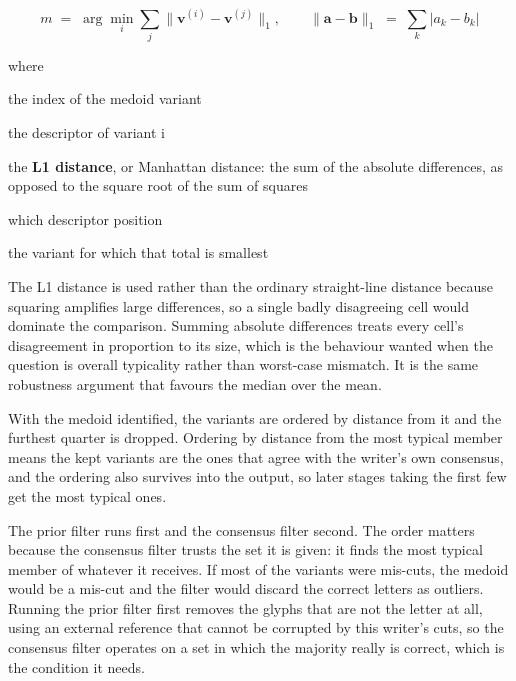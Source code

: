 \begin{equation}
m \;=\; \arg\min_{i} \sum_{j} \big\| \mathbf{v}^{(i)} - \mathbf{v}^{(j)} \big\|_{1}, \qquad \big\|\mathbf{a} - \mathbf{b}\big\|_{1} \;=\; \sum_{k} \big| a_k - b_k \big|
\end{equation}

\noindent where
\begin{description}[leftmargin=2.4em,style=nextline,font=\normalfont\ttfamily]\setlength\itemsep{1pt}
  \item[{$m$}] \normalfont the index of the medoid variant
  \item[{$\mathbf{v}^{(i)}$}] \normalfont the descriptor of variant i
  \item[{$\|\cdot\|_{1}$}] \normalfont the \textbf{L1 distance}, or Manhattan distance: the sum of the absolute differences, as opposed to the square root of the sum of squares
  \item[{$k$}] \normalfont which descriptor position
  \item[{$\arg\min_i$}] \normalfont the variant for which that total is smallest
\end{description}
The L1 distance is used rather than the ordinary straight-line distance because squaring amplifies large differences, so a single badly disagreeing cell would dominate the comparison. Summing absolute differences treats every cell's disagreement in proportion to its size, which is the behaviour wanted when the question is overall typicality rather than worst-case mismatch. It is the same robustness argument that favours the median over the mean.


With the medoid identified, the variants are ordered by distance from it and the furthest quarter is dropped. Ordering by distance from the most typical member means the kept variants are the ones that agree with the writer's own consensus, and the ordering also survives into the output, so later stages taking the first few get the most typical ones.


The prior filter runs first and the consensus filter second. The order matters because the consensus filter trusts the set it is given: it finds the most typical member of whatever it receives. If most of the variants were mis-cuts, the medoid would be a mis-cut and the filter would discard the correct letters as outliers. Running the prior filter first removes the glyphs that are not the letter at all, using an external reference that cannot be corrupted by this writer's cuts, so the consensus filter operates on a set in which the majority really is correct, which is the condition it needs.


